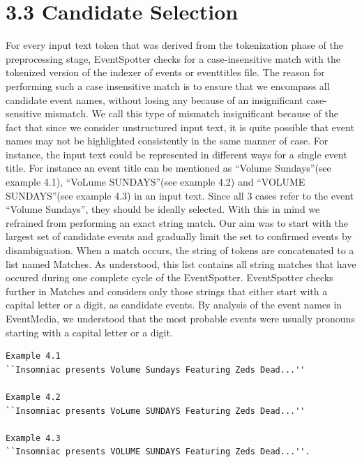 \documentclass[a4paper,11pt]{report}
\begin{document}

\section*{3.3 Candidate Selection}

For every input text token that was derived from the tokenization phase of the preprocessing stage, EventSpotter checks for a case-insensitive match with the tokenized version of the indexer of events or eventtitles file. The reason for performing such a case insensitive match is to ensure that we encompass all candidate event names, without losing any because of an insignificant case-sensitive mismatch. We call this type of mismatch insignificant because of the fact that since we consider unstructured input text, it is quite possible that event names may not be highlighted consistently in the same manner of case. For instance, the input text could be represented in different ways for a single event title. For instance an event title can be mentioned as ``Volume Sundays''(see example 4.1), ``VoLume SUNDAYS''(see example 4.2) and ``VOLUME SUNDAYS''(see example 4.3) in an input text. Since all 3 cases refer to the event ``Volume Sundays'', they  should be ideally selected. With this in mind we refrained from performing an exact string match. Our aim was to start with the largest set of candidate events and gradually limit the set to confirmed events by disambiguation. When a match occurs, the string of tokens are concatenated to a list named Matches. As understood, this list contains all string matches that have occured during one complete cycle of the EventSpotter. EventSpotter checks further in Matches and considers only those strings that either start with a capital letter or a digit, as candidate events. By analysis of the event names in  EventMedia, we understood that the most probable events were usually pronouns starting with a capital letter or a digit. \newline 

\begin{lstlisting}[caption= This listing shows different representations of input text for a single event title.]
Example 4.1
``Insomniac presents Volume Sundays Featuring Zeds Dead...''

Example 4.2
``Insomniac presents VoLume SUNDAYS Featuring Zeds Dead...'' 

Example 4.3
``Insomniac presents VOLUME SUNDAYS Featuring Zeds Dead...''.
\end{lstlisting}
\end{document}
